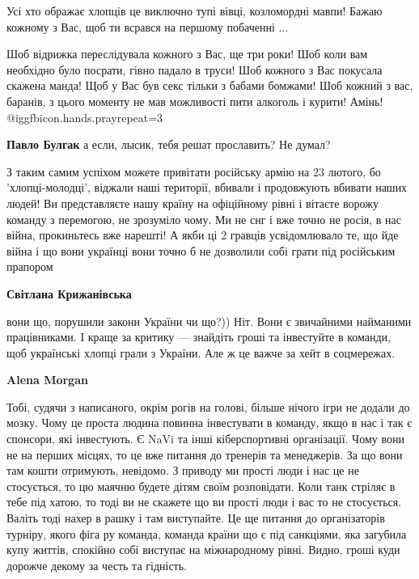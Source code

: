 \begin{itemize}
\begin{itemize}
Усі хто ображає хлопців це виключно тупі вівці, козломордні мавпи! Бажаю кожному з Вас, щоб ти всрався на першому побаченні ...

Шоб відрижка переслідувала кожного з Вас, ще три роки! Шоб коли вам необхідно
було посрати, гівно падало в труси! Шоб кожного з Вас покусала скажена манда!
Щоб у Вас був секс тільки з бабами бомжами! Шоб кожний з вас, баранів, з цього
моменту не мав можливості пити алкоголь і курити! Амінь!  @igg{fbicon.hands.pray}{repeat=3} 

\textbf{Павло Булгак} а если, лысик, тебя решат прославить? Не думал?
\end{itemize} %


З таким самим успіхом можете привітати російську армію на 23 лютого, бо
'хлопці-молодці', віджали наші території, вбивали і продовжують вбивати наших
людей! Ви представляєте нашу країну на офіційному рівні і вітаєте ворожу
команду з перемогою, не зрозуміло чому. Ми не снг і вже точно не росія, в нас
війна, прокиньтесь вже нарешті! А якби ці 2 гравців усвідомлювало те, що йде
війна і що вони українці вони точно б не дозволили собі грати під російським
прапором

\begin{itemize} %
\textbf{Світлана Крижанівська} 

вони що, порушили закони України чи що?)) Ніт. Вони є звичайними найманими
працівниками. І краще за критику — знайдіть гроші та інвестуйте в команди, щоб
українські хлопці грали з України. Але ж це важче за хейт в соцмережах.

\begin{itemize} %
\textbf{Alena Morgan} 

Тобі, судячи з написаного, окрім рогів на голові, більше нічого ігри не додали
до мозку. Чому це проста людина повинна інвестувати в команду, якщо в нас і так
є спонсори, які інвестують. Є NaVi та інші кіберспортивні організації. Чому
вони не на перших місцях, то це вже питання до тренерів та менеджерів. За що
вони там кошти отримують, невідомо. З приводу ми прості люди і нас це не
стосується, то цю маячню будете дітям своїм розповідати. Коли танк стріляє в
тебе під хатою, то тоді ви не скажете що ви прості люди і вас то не стосується.
Валіть тоді нахер в рашку і там виступайте. Це ще питання до організаторів
турніру, якого фіга ру команда, команда країни що є під санкціями, яка загубила
купу життів, спокійно собі виступає на міжнародному рівні. Видно, гроші куди
дорожче декому за честь та гідність.



\end{itemize}
\end{itemize}
\end{itemize}
